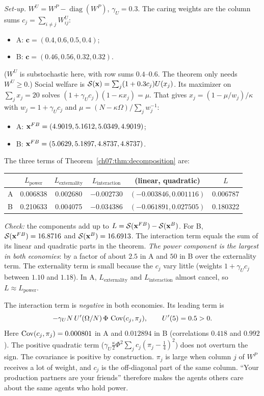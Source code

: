 \documentclass[../solutions_manual.tex]{subfiles}
\begin{document}
 \emph{Set-up.} $W^U = W^P - \operatorname{diag}(W^P)$, $\gamma_U = 0.3$. The caring weights are the column sums $c_j = \sum_{i\neq j}W^U_{ij}$:
\begin{itemize}
\item A: $\mathbf{c} = (0.4, 0.6, 0.5, 0.4)$;
\item B: $\mathbf{c} = (0.46, 0.56, 0.32, 0.32)$.
\end{itemize}
($W^U$ is substochastic here, with row sums $0.4$--$0.6$. The theorem only needs $W^U \ge 0$.) Social welfare is $\mathcal{S}(\mathbf{x}) = \sum_j(1 + 0.3c_j)U(x_j)$. Its maximizer on $\sum_j x_j = 20$ solves $(1 + \gamma_Uc_j)(1 - \kappa x_j) = \mu$. That gives $x_j = (1 - \mu/w_j)/\kappa$ with $w_j = 1 + \gamma_U c_j$ and $\mu = (N - \kappa\Omega)/\sum_j w_j^{-1}$:
\begin{itemize}
\item A: $\mathbf{x}^{FB} = (4.9019, 5.1612, 5.0349, 4.9019)$;
\item B: $\mathbf{x}^{FB} = (5.0629, 5.1897, 4.8737, 4.8737)$.
\end{itemize}
The three terms of Theorem~\ref{ch07:thm:decomposition} are:
\begin{center}
\begin{tabular}{lccccc}
\toprule
& $L_{\text{power}}$ & $L_{\text{externality}}$ & $L_{\text{interaction}}$ & (linear, quadratic) & $L$ \\
\midrule
A & 0.006838 & 0.002680 & $-0.002730$ & $(-0.003846, 0.001116)$ & 0.006787 \\
B & 0.210633 & 0.004075 & $-0.034386$ & $(-0.061891, 0.027505)$ & 0.180322 \\
\bottomrule
\end{tabular}
\end{center}
\emph{Check:} the components add up to $L = \mathcal{S}(\mathbf{x}^{FB}) - \mathcal{S}(\mathbf{x}^B)$. For B, $\mathcal{S}(\mathbf{x}^{FB}) = 16.8716$ and $\mathcal{S}(\mathbf{x}^B) = 16.6913$. The interaction term equals the sum of its linear and quadratic parts in the theorem. \emph{The power component is the largest in both economies}: by a factor of about $2.5$ in A and $50$ in B over the externality term. The externality term is small because the $c_j$ vary little (weights $1 + \gamma_U c_j$ between $1.10$ and $1.18$). In A, $L_{\text{externality}}$ and $L_{\text{interaction}}$ almost cancel, so $L \approx L_{\text{power}}$.

 The interaction term is \emph{negative} in both economies. Its leading term is
\[
-\gamma_U N\,U'(\Omega/N)\,\Phi\,\operatorname{Cov}(c_j, \pi_j), \qquad U'(5) = 0.5 > 0.
\] Here $\operatorname{Cov}(c_j, \pi_j) = 0.000801$ in A and $0.012894$ in B (correlations $0.418$ and $0.992$). The positive quadratic term ($\gamma_U\frac{\kappa}{2}\Phi^2\sum_jc_j(\pi_j - \frac14)^2$) does not overturn the sign. The covariance is positive by construction. $\pi_j$ is large when column $j$ of $W^P$ receives a lot of weight, and $c_j$ is the off-diagonal part of the same column. ``Your production partners are your friends'' therefore makes the agents others care about the same agents who hold power.
\end{document}
